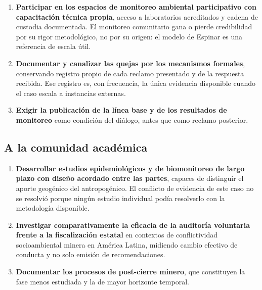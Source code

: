 \begin{enumerate}
  \item \textbf{Participar en los espacios de monitoreo ambiental participativo
        con capacitación técnica propia}, acceso a laboratorios acreditados y
        cadena de custodia documentada. El monitoreo comunitario gana o pierde
        credibilidad por su rigor metodológico, no por su origen: el modelo de
        Espinar es una referencia de escala útil.
  \item \textbf{Documentar y canalizar las quejas por los mecanismos formales},
        conservando registro propio de cada reclamo presentado y de la respuesta
        recibida. Ese registro es, con frecuencia, la única evidencia disponible
        cuando el caso escala a instancias externas.
  \item \textbf{Exigir la publicación de la línea base y de los resultados de
        monitoreo} como condición del diálogo, antes que como reclamo posterior.
\end{enumerate}

\subsection{A la comunidad académica}

\begin{enumerate}
  \item \textbf{Desarrollar estudios epidemiológicos y de biomonitoreo de largo
        plazo con diseño acordado entre las partes}, capaces de distinguir el
        aporte geogénico del antropogénico. El conflicto de evidencia de este caso
        no se resolvió porque ningún estudio individual podía resolverlo con la
        metodología disponible.
  \item \textbf{Investigar comparativamente la eficacia de la auditoría
        voluntaria frente a la fiscalización estatal} en contextos de
        conflictividad socioambiental minera en América Latina, midiendo cambio
        efectivo de conducta y no solo emisión de recomendaciones.
  \item \textbf{Documentar los procesos de post-cierre minero}, que constituyen
        la fase menos estudiada y la de mayor horizonte temporal.
\end{enumerate}
